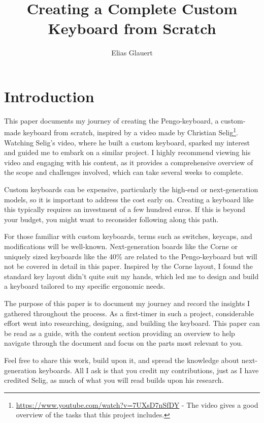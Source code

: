 \documentclass[a4paper,12pt]{article}
\title{Creating a Complete Custom Keyboard from Scratch}
\author{Elias Glauert}
\begin{document}
\maketitle

\pagebreak

\tableofcontents

\pagebreak

\section{Introduction}

This paper documents my journey of creating the Pengo-keyboard, a custom-made keyboard from scratch, inspired by a video made by Christian Selig\footnote{\url{https://www.youtube.com/watch?v=7UXsD7nSfDY} - The video gives a good overview of the tasks that this project includes.}. Watching Selig's video, where he built a custom keyboard, sparked my interest and guided me to embark on a similar project. I highly recommend viewing his video and engaging with his content, as it provides a comprehensive overview of the scope and challenges involved, which can take several weeks to complete.

Custom keyboards can be expensive, particularly the high-end or next-generation models, so it is important to address the cost early on. Creating a keyboard like this typically requires an investment of a few hundred euros. If this is beyond your budget, you might want to reconsider following along this path.

For those familiar with custom keyboards, terms such as switches, keycaps, and modifications will be well-known. Next-generation boards like the Corne or uniquely sized keyboards like the 40\% are related to the Pengo-keyboard but will not be covered in detail in this paper. Inspired by the Corne layout, I found the standard key layout didn't quite suit my hands, which led me to design and build a keyboard tailored to my specific ergonomic needs.

The purpose of this paper is to document my journey and record the insights I gathered throughout the process. As a first-timer in such a project, considerable effort went into researching, designing, and building the keyboard. This paper can be read as a guide, with the content section providing an overview to help navigate through the document and focus on the parts most relevant to you.

Feel free to share this work, build upon it, and spread the knowledge about next-generation keyboards. All I ask is that you credit my contributions, just as I have credited Selig, as much of what you will read builds upon his research.
\end{document}
